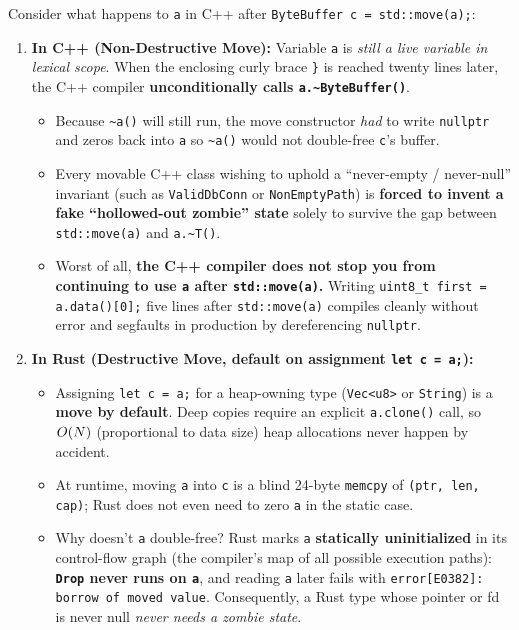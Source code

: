 Consider what happens to \texttt{a} in C++ after \texttt{ByteBuffer c = std::move(a);}:
\begin{enumerate}
  \item \textbf{In C++ (Non-Destructive Move):} Variable \texttt{a} is \emph{still a live variable in lexical scope}. When the enclosing curly brace \texttt{\}} is reached twenty lines later, the C++ compiler \textbf{unconditionally calls \texttt{a.\textasciitilde ByteBuffer()}}.
  \begin{itemize}
    \item Because \texttt{\textasciitilde a()} will still run, the move constructor \emph{had} to write \texttt{nullptr} and zeros back into \texttt{a} so \texttt{\textasciitilde a()} would not double-free \texttt{c}'s buffer.
    \item Every movable C++ class wishing to uphold a ``never-empty / never-null'' invariant (such as \texttt{ValidDbConn} or \texttt{NonEmptyPath}) is \textbf{forced to invent a fake ``hollowed-out zombie'' state} solely to survive the gap between \texttt{std::move(a)} and \texttt{a.\textasciitilde T()}.
    \item Worst of all, \textbf{the C++ compiler does not stop you from continuing to use \texttt{a} after \texttt{std::move(a)}.} Writing \texttt{uint8\_t first = a.data()[0];} five lines after \texttt{std::move(a)} compiles cleanly without error and segfaults in production by dereferencing \texttt{nullptr}.
  \end{itemize}
  \item \textbf{In Rust (Destructive Move, default on assignment \texttt{let c = a;}):}
  \begin{itemize}
    \item Assigning \texttt{let c = a;} for a heap-owning type (\texttt{Vec<u8>} or \texttt{String}) is a \textbf{move by default}. Deep copies require an explicit \texttt{a.clone()} call, so $O(N)$ (proportional to data size) heap allocations  never happen by accident.
    \item At runtime, moving \texttt{a} into \texttt{c} is a blind 24-byte \texttt{memcpy} of \texttt{(ptr, len, cap)}; Rust does not even need to zero \texttt{a} in the static case.
    \item Why doesn't \texttt{a} double-free? Rust marks \texttt{a} \textbf{statically uninitialized} in its control-flow graph (the compiler's map of all possible execution paths): \textbf{\texttt{Drop} never runs on \texttt{a}}, and reading \texttt{a} later fails with \texttt{error[E0382]: borrow of moved value}. Consequently, a Rust type whose pointer or fd is never null \emph{never needs a zombie state}.
  \end{itemize}
\end{enumerate}

